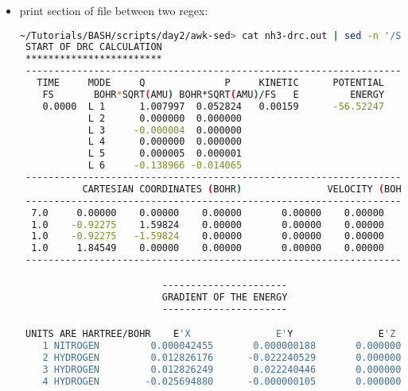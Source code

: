 \documentclass[slidestop,mathserif,compress,xcolor=svgnames]{beamer}
\begin{document}
\begin{frame}
{\begin{itemize}
\begin{lstlisting}[language=bash,basicstyle=\fontsize{4}{5}\selectfont\ttfamily]
echo ``Hello World!''
~/Tutorials/BASH/scripts/day1/examples> sed -i.bak -e 's/bash/tcsh/g' -e 's/First/First tcsh/g' hello1.sh 
~/Tutorials/BASH/scripts/day1/examples> cat hello1.sh
#!/bin/tcsh

# My First tcsh Script

echo ``Hello World!''
~/Tutorials/BASH/scripts/day1/examples> cat hello1.sh.bak
#!/bin/bash

# My First Script

echo ``Hello World!''
      \end{lstlisting}
      \framebreak
    \item print section of file between two regex:
      \begin{lstlisting}[language=bash]
~/Tutorials/BASH/scripts/day2/awk-sed> cat nh3-drc.out | sed -n '/START OF DRC CALCULATION/,/END OF ONE-ELECTRON INTEGRALS/p'
 START OF DRC CALCULATION
 ************************
 ---------------------------------------------------------------------------
   TIME     MODE     Q              P     KINETIC      POTENTIAL          TOTAL
    FS       BOHR*SQRT(AMU) BOHR*SQRT(AMU)/FS   E         ENERGY         ENERGY
    0.0000  L 1      1.007997  0.052824   0.00159      -56.52247      -56.52087
            L 2      0.000000  0.000000
            L 3     -0.000004  0.000000
            L 4      0.000000  0.000000
            L 5      0.000005  0.000001
            L 6     -0.138966 -0.014065
 ---------------------------------------------------------------------------
           CARTESIAN COORDINATES (BOHR)               VELOCITY (BOHR/FS)
 ---------------------------------------------------------------------------
  7.0     0.00000    0.00000    0.00000       0.00000    0.00000   -0.00616
  1.0    -0.92275    1.59824    0.00000       0.00000    0.00000    0.02851
  1.0    -0.92275   -1.59824    0.00000       0.00000    0.00000    0.02851
  1.0     1.84549    0.00000    0.00000       0.00000    0.00000    0.02851
 ---------------------------------------------------------------------------

                         ----------------------
                         GRADIENT OF THE ENERGY
                         ----------------------

 UNITS ARE HARTREE/BOHR    E'X               E'Y               E'Z 
    1 NITROGEN         0.000042455       0.000000188       0.000000000
    2 HYDROGEN         0.012826176      -0.022240529       0.000000000
    3 HYDROGEN         0.012826249       0.022240446       0.000000000
    4 HYDROGEN        -0.025694880      -0.000000105       0.000000000
 

\end{lstlisting}
\end{itemize}}
\end{frame}
\end{document}
